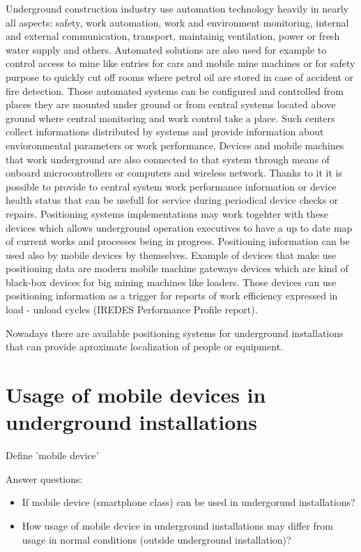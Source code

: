 \documentclass[../main.tex]{subfiles}
\begin{document}
Underground construction industry use automation technology heavily in nearly all aspects: safety, work automation, work and environment monitoring, internal and external communication, transport, maintainig ventilation, power or fresh water supply and others. Automated solutions are also used for example to control access to mine like entries for cars and mobile mine machines or for safety purpose to quickly cut off rooms where petrol oil are stored in case of accident or fire detection. Those automated systems can be configured and controlled from places they are mounted under ground or from central systems located above ground where central monitoring and work control take a place. Such centers collect informations distributed by systems and provide information about envioronmental parameters or work performance. Devices and mobile machines that work underground are also connected to that system through means of onboard microcontrollers or computers and wireless network. Thanks to it it is possible to provide to central system work performance information or device health status that can be usefull for service during periodical device checks or repairs. Positioning systems implementations may work togehter with these devices which allows underground operation executives to have a up to date map of current works and processes being in progress. Positioning information can be used also by mobile devices by themselves. Example of devices that make use positioning data are modern mobile machine gateways devices \cite{Thesis_CM} which are kind of black-box devices for big mining machines like loaders. Those devices can use positioning information as a trigger for reports of work efficiency expressed in load - unload cycles (IREDES Performance Profile report).


Nowadays there are available positioning systems for underground installations that can provide aproximate localization of people or equipment.



\section{Usage of mobile devices in underground installations}
Define 'mobile device'

Answer questions:
\begin{itemize}
	\item If mobile device (smartphone class) can be used in undergorund installations?
	\item How usage of mobile device in underground installations may differ from usage in normal conditions (outside underground installation)?
\end{itemize}
\end{document}
